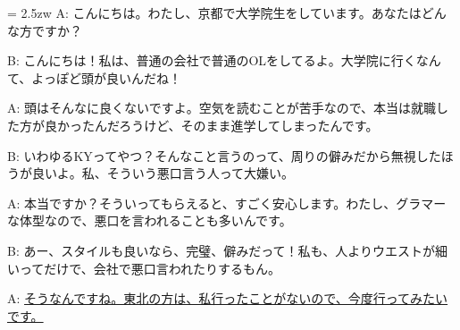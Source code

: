 \documentclass[11pt]{amsart}
\title{}
\author{}
\newenvironment{hangall}[1]{\hangindent = 2.5zw\everypar{\hangindent = 2.5zw}}{}
\begin{document}
\maketitle
\begin{hangall}{}%
A: こんにちは。わたし、京都で大学院生をしています。あなたはどんな方ですか？

B: こんにちは！私は、普通の会社で普通のOLをしてるよ。大学院に行くなんて、よっぽど頭が良いんだね！

A: 頭はそんなに良くないですよ。空気を読むことが苦手なので、本当は就職した方が良かったんだろうけど、そのまま進学してしまったんです。

B: いわゆるKYってやつ？そんなこと言うのって、周りの僻みだから無視したほうが良いよ。私、そういう悪口言う人って大嫌い。

A: 本当ですか？そういってもらえると、すごく安心します。わたし、グラマーな体型なので、悪口を言われることも多いんです。

B: あー、スタイルも良いなら、完璧、僻みだって！私も、人よりウエストが細いってだけで、会社で悪口言われたりするもん。

A: \ul{そうなんですね。東北の方は、私行ったことがないので、今度行ってみたいです。}\end{hangall}
\end{document}
